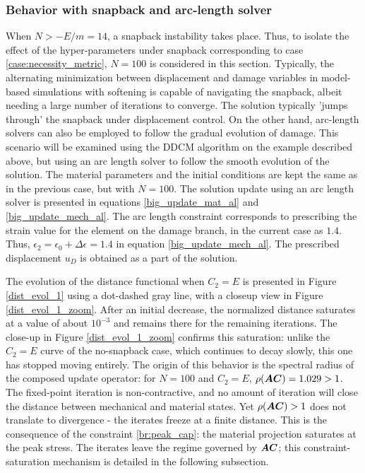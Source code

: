 \documentclass[10pt]{cas-sc}
\newcommand{\deleted}[1]{}
\newcommand{\added}[1]{#1}
\begin{document}
\subsubsection*{Behavior with snapback and arc-length solver}
\added{When $N>-E/m=14$, a snapback instability takes place. Thus, to isolate the effect of the hyper-parameters under snapback corresponding to case \ref{case:necessity_metric}, $N=100$ is considered in this section. Typically, the alternating minimization between displacement and damage variables in model-based simulations with softening is capable of navigating the snapback, albeit needing a large number of iterations to converge.} \deleted{When the element size is decreased, a snapback response is expected to occur. In conventional simulations performed using constitutive models, the alternating minimization performed with respect to the displacement and the damage variables is capable of capturing the snapback, albeit taking a large number of iterations to converge.} The solution typically 'jumps through' the snapback under displacement control. \added{On the other hand, arc-length solvers can also be employed to follow the gradual evolution of damage.} This scenario will be examined \deleted{when using DD algorithm using the example described above,}\added{using the DDCM algorithm on the example described above,} \added{but} using an arc length solver to follow the smooth evolution of the solution. The material parameters and the initial conditions are kept the same as in the previous case, but with $N=100$. The solution update using an arc length solver is presented in equations \eqref{big_update_mat_al} and \eqref{big_update_mech_al}. The arc length constraint corresponds to prescribing the strain value for the element on the damage branch, in the current case as $1.4$. Thus, $\epsilon_2=\epsilon_0+\Delta \epsilon =1.4$ in equation \eqref{big_update_mech_al}. The prescribed displacement $u_D$ is obtained as a part of the solution.


\added{The evolution of the distance functional when $C_2=E$ is presented in Figure \ref{dist_evol_1} using a dot-dashed gray line, with a closeup view in Figure \ref{dist_evol_1_zoom}. After an initial decrease, the normalized distance saturates at a value of about $10^{-3}$ and remains there for the remaining iterations. The close-up in Figure \ref{dist_evol_1_zoom} confirms this saturation: unlike the $C_2=E$ curve of the no-snapback case, which continues to decay slowly, this one has stopped moving entirely. The origin of this behavior is the spectral radius of the composed update operator: for $N=100$ and $C_2=E$, $\rho(\mbox{\boldmath $A$}\mbox{\boldmath $C$}) = 1.029 > 1$. The fixed-point iteration is non-contractive, and no amount of iteration will close the distance between mechanical and material states. Yet $\rho(\mbox{\boldmath $A$}\mbox{\boldmath $C$}) > 1$ does not translate to divergence - the iterates freeze at a finite distance. This is the consequence of the constraint \ref{br:peak_cap}: the material projection saturates at the peak stress. The iterates leave the regime governed by $\mbox{\boldmath $A$}\mbox{\boldmath $C$}$; this constraint-saturation mechanism is detailed in the following subsection.}
\end{document}
